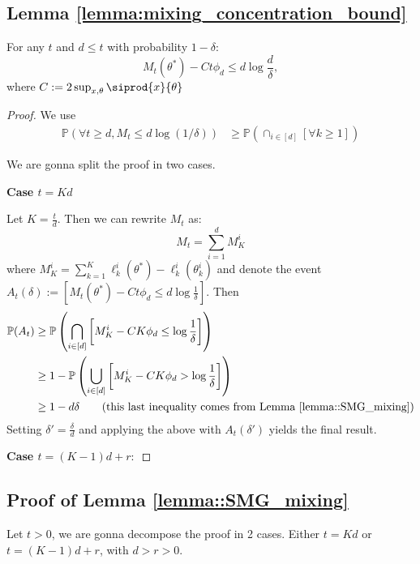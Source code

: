 \subsection{Lemma \ref{lemma:mixing_concentration_bound}}
\begin{lemma}
\label{lemma:mixing_concentration_bound}
    For any $t$ and $d \leq t$ with probability $1-\delta$:
    \[ M_t(\theta^*)-Ct\phi_d \leq d \log\frac{d}{\delta},\]
    where $C:=2\sup_{x,\theta} \siprod{x}{\theta}$
\end{lemma}
\begin{proof}
We use 
\begin{align*}
\mathbb{P}(\forall t \geq d, M_t \leq d\log(1/\delta)) &\geq \mathbb{P}\left(\cap_{i \in [d]}[\forall k \geq 1]\right)
\end{align*}

\label{proof::lemma_mixing_concentration_bound}
We are gonna split the proof in two cases.

\textbf{Case $t=Kd$}


   Let $K =\frac{t}{d}$. Then we can rewrite $M_t$ as:
   \[M_t = \sum_{i=1}^d M_K^i\] where $M_K^i = \sum_{k=1}^K \ell_{k}^i(\theta^*)-\ell_{k}^i(\theta_{k}^i)$ and denote the event $A_t(\delta) := [M_t(\theta^*) - Ct\phi_d \leq d \log \frac{1}{\delta}].$ Then 
    \begin{align*}
        \mathbb{P}(A_t) &\geq \mathbb{P}\left(\bigcap_{i \in [d]} \left[M_K^i-CK\phi_d \leq \log \frac{1}{\delta} \right]\right)\\
        &\geq 1 -\mathbb{P}\left(\bigcup_{i \in [d]} \left[M_K^i-CK\phi_d > \log \frac{1}{\delta}  \right]\right) \\
        &\geq 1-d\delta \qquad (\text{this last inequality comes from Lemma \ref{lemma::SMG_mixing})}
    \end{align*}
    Setting $\delta'=\frac {\delta}{d}$ and applying the above  with $A_t(\delta')$ yields the final result.
    
  \textbf{Case $t=(K-1)d + r:$}

\end{proof}
\subsection{Proof of Lemma \ref{lemma::SMG_mixing}}


\label{proof:SMG_mixing}
 

Let $t > 0$, we are gonna decompose the proof in 2 cases.  Either $t=Kd$ or $t = (K-1)d + r$, with $d>r>0$.

